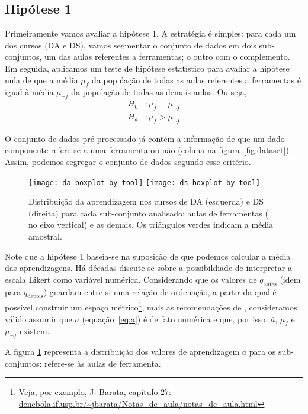 \subsection{Hipótese 1}

Primeiramente vamos avaliar a hipótese 1.
A estratégia é simples: para cada um dos cursos (DA e DS), vamos segmentar o conjunto de dados em dois sub-conjuntos, um das aulas referentes a ferramentas; o outro com o complemento.
Em seguida, aplicamos um teste de hipótese estatístico para avaliar a hipótese nula de que a média $\mu_f$ da população de todas as aulas referentes a ferramentas é igual à média $\mu_{\neg f}$ da população de todas as demais aulas.
Ou seja,
\begin{align*}
	H_0&: \mu_f = \mu_{\neg f} \\
	H_a&: \mu_f > \mu_{\neg f}
\end{align*}

O conjunto de dados pré-processado já contém a informação de que um dado componente refere-se a uma ferramenta ou não (coluna  na figura~\ref{fig:dataset}).
Assim, podemos segregar o conjunto de dados segundo esse critério.

\begin{figure}[b]
	\centering
	\texttt{[image: da-boxplot-by-tool]}\hfill
	\texttt{[image: ds-boxplot-by-tool]}
	\caption{Distribuição da aprendizagem nos cursos de DA (esquerda) e DS (direita) para cada sub-conjunto analisado: aulas de ferramentas ( no eixo vertical) e as demais. Os triângulos verdes indicam a média amostral.}
	\label{fig:dist-hipotese-1}
\end{figure}

Note que a hipótese 1 baseia-se na suposição de que podemos calcular a média das aprendizagens.
Há décadas discute-se sobre a possibildiade de interpretar a escala Likert como variável numérica.
Considerando que os valores de $q_\text{antes}$ (idem para $q_\text{depois}$) guardam entre si uma relação de ordenação, a partir da qual é possível construir um espaço métrico\footnote{Veja, por exemplo, J. Barata, capítulo 27: \url{denebola.if.usp.br/~jbarata/Notas_de_aula/notas_de_aula.html}}, mais as recomendações de \cite{Harpe2015}, consideramos válido assumir que $a$ (equação~\ref{eq:a}) é de fato numérica e que, por isso, $\bar a$, $\mu_f$ e $\mu_{\neg f}$ existem.

A figura \ref{fig:dist-hipotese-1} representa a distribuição dos valores de aprendizagem $a$ para os sub-conjuntos:  refere-se às aulas de ferramenta.

